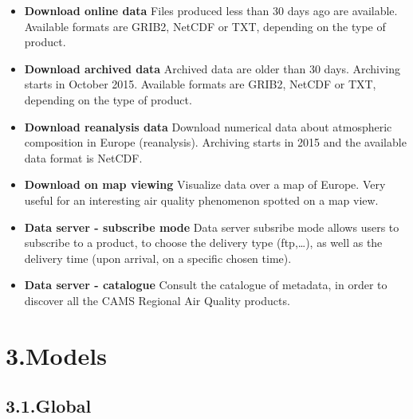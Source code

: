\documentclass[9pt]{report}
\begin{document}
\begin{itemize}[noitemsep,topsep=\mdcompacttopsep]%

\item{}\textbf{Download online data}
Files produced less than 30 days ago are available. Available formats are GRIB2, NetCDF or TXT, depending on the type of product.%

\item{}\textbf{Download archived data}
Archived data are older than 30 days. Archiving starts in October 2015. Available formats are GRIB2, NetCDF or TXT, depending on the type of product.%

\item{}\textbf{Download reanalysis data}
Download numerical data about atmospheric composition in Europe (reanalysis). Archiving starts in 2015 and the available data format is NetCDF.%

\item{}\textbf{Download on map viewing}
Visualize data over a map of Europe. Very useful for an interesting air quality phenomenon spotted on a map view.%

\item{}\textbf{Data server - subscribe mode}
Data server subsribe mode allows users to subscribe to a product, to choose the delivery type (ftp,\dots{}), as well as the delivery time (upon arrival, on a specific chosen time).%

\item{}\textbf{Data server - catalogue}
Consult the catalogue of metadata, in order to discover all the CAMS Regional Air Quality products.%
\end{itemize}%

\section{3.\hspace*{0.5em}Models}\label{sec-models}%

\subsection{3.1.\hspace*{0.5em}Global}\label{sec-global}%
\end{document}
